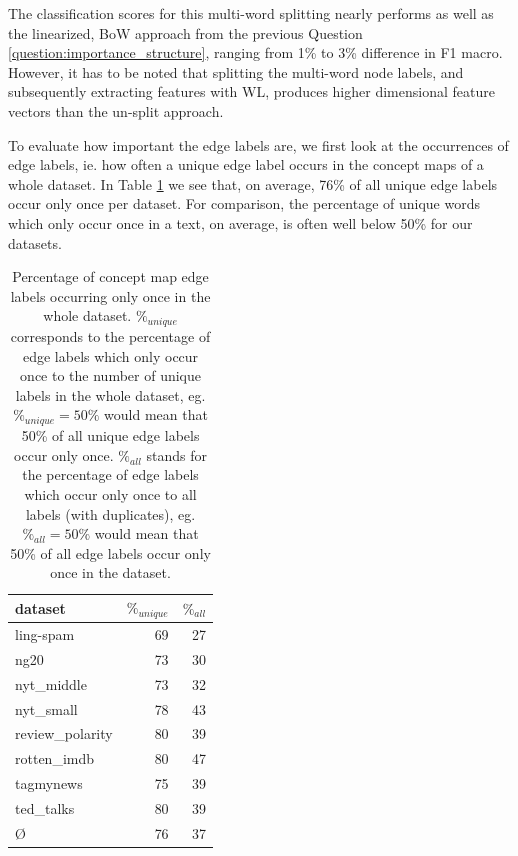 The classification scores for this multi-word splitting nearly performs as well as the linearized, BoW approach from the previous Question \ref{question:importance_structure}, ranging from 1\% to 3\% difference in F1 macro.
However, it has to be noted that splitting the multi-word node labels, and subsequently extracting features with WL, produces higher dimensional feature vectors than the un-split approach.



To evaluate how important the edge labels are, we first look at the occurrences of edge labels, ie. how often a unique edge label occurs in the concept maps of a whole dataset.
In Table \ref{table:edge_label_occurrences} we see that, on average, 76\% of all unique edge labels occur only once per dataset. For comparison, the percentage of unique words which only occur once in a text, on average, is often well below 50\% for our datasets.

\begin{table}[htb!]
	\centering
	\begin{tabular}{lrr}
\toprule
		dataset &  $ \%_{unique} $ & $ \%_{all}$  \\
		\midrule
		ling-spam       & 69 & 27 \\
		ng20            & 73 & 30 \\
		nyt\_middle      & 73 & 32 \\
		nyt\_small       & 78 & 43 \\
		review\_polarity & 80 & 39 \\
		rotten\_imdb     & 80 & 47 \\
		tagmynews       & 75 & 39 \\
		ted\_talks       & 80 & 39 \\
		\midrule
		\O           & 76 & 37 \\
		\bottomrule
	\end{tabular}
	\caption[Statistics: Percentage of concept map labels occurring once]{Percentage of concept map edge labels occurring only once in the whole dataset.
		$ \%_{unique} $ corresponds to the percentage of edge labels which only occur once to the number of unique labels in the whole dataset, eg. $ \%_{unique} = 50\% $ would mean that 50\% of all unique edge labels occur only once.
		$ \%_{all}$ stands for the percentage of edge labels which occur only once to all labels (with duplicates), eg. $ \%_{all} = 50\%$ would mean that 50\% of all edge labels occur only once in the dataset.}\label{table:edge_label_occurrences}
\end{table}


